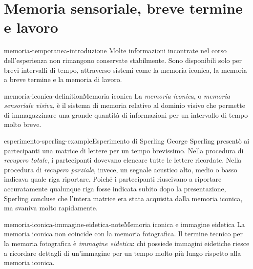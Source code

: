 \documentclass[preview]{standalone}
\begin{document}
\genpage

\section{Memoria sensoriale, breve termine e lavoro}

\begin{snippet}{memoria-temporanea-introduzione}
    Molte informazioni incontrate nel corso dell'esperienza non rimangono
    conservate stabilmente. Sono disponibili solo per brevi intervalli di tempo,
    attraverso sistemi come la memoria iconica, la memoria a breve termine e la
    memoria di lavoro.
\end{snippet}

\begin{snippetdefinition}{memoria-iconica-definition}{Memoria iconica}
    La \emph{memoria iconica}, o \emph{memoria sensoriale visiva}, è il sistema
    di memoria relativo al dominio visivo che permette di immagazzinare una
    grande quantità di informazioni per un intervallo di tempo molto breve.
\end{snippetdefinition}

\begin{snippetexample}{esperimento-sperling-example}{Esperimento di Sperling}
    George Sperling presentò ai partecipanti una matrice di lettere per un tempo
    brevissimo. Nella procedura di \emph{recupero totale}, i partecipanti
    dovevano elencare tutte le lettere ricordate. Nella procedura di
    \emph{recupero parziale}, invece, un segnale acustico alto, medio o basso
    indicava quale riga riportare. Poiché i partecipanti riuscivano a riportare
    accuratamente qualunque riga fosse indicata subito dopo la presentazione,
    Sperling concluse che l'intera matrice era stata acquisita dalla memoria
    iconica, ma svaniva molto rapidamente.
\end{snippetexample}


\begin{snippetnote}{memoria-iconica-immagine-eidetica-note}{Memoria iconica e immagine eidetica}
    La memoria iconica non coincide con la memoria fotografica. Il termine
    tecnico per la memoria fotografica è \emph{immagine eidetica}: chi possiede
    immagini eidetiche riesce a ricordare dettagli di un'immagine per un tempo
    molto più lungo rispetto alla memoria iconica.
\end{snippetnote}
\end{document}
